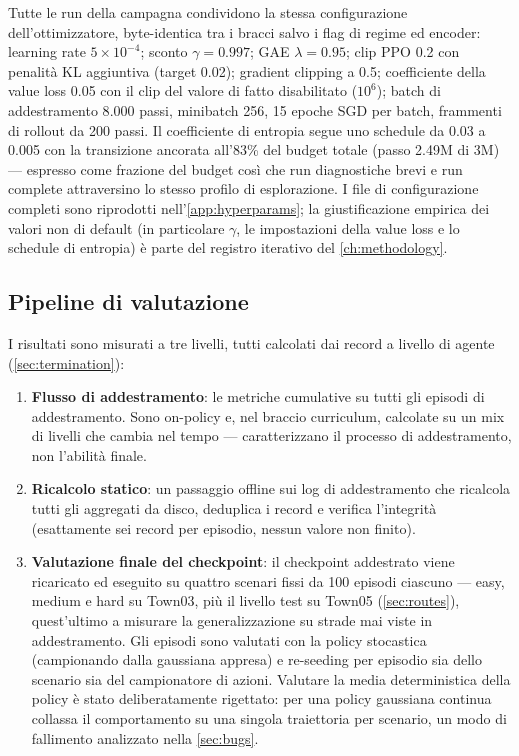 Tutte le run della campagna condividono la stessa configurazione
dell'ottimizzatore, byte-identica tra i bracci salvo i flag di regime ed
encoder: learning rate $5\times10^{-4}$; sconto $\gamma = 0.997$; GAE
$\lambda = 0.95$; clip PPO 0.2 con penalità KL aggiuntiva (target 0.02);
gradient clipping a 0.5; coefficiente della value loss 0.05 con il clip
del valore di fatto disabilitato ($10^6$); batch di addestramento
8{.}000 passi, minibatch 256, 15 epoche SGD per batch, frammenti di
rollout da 200 passi. Il coefficiente di entropia segue uno schedule da
0.03 a 0.005 con la transizione ancorata all'83\% del budget totale
(passo 2.49M di 3M) --- espresso come frazione del budget così che run
diagnostiche brevi e run complete attraversino lo stesso profilo di
esplorazione. I file di configurazione completi sono riprodotti
nell'\cref{app:hyperparams}; la giustificazione empirica dei valori non
di default (in particolare $\gamma$, le impostazioni della value loss e
lo schedule di entropia) è parte del registro iterativo del
\cref{ch:methodology}.

\subsection{Pipeline di valutazione}
\label{sec:eval-pipeline}

I risultati sono misurati a tre livelli, tutti calcolati dai record a
livello di agente (\cref{sec:termination}):

\begin{enumerate}
  \item \textbf{Flusso di addestramento}: le metriche cumulative su
        tutti gli episodi di addestramento. Sono on-policy e, nel
        braccio curriculum, calcolate su un mix di livelli che cambia
        nel tempo --- caratterizzano il processo di addestramento, non
        l'abilità finale.
  \item \textbf{Ricalcolo statico}: un passaggio offline sui log di
        addestramento che ricalcola tutti gli aggregati da disco,
        deduplica i record e verifica l'integrità (esattamente sei
        record per episodio, nessun valore non finito).
  \item \textbf{Valutazione finale del checkpoint}: il checkpoint
        addestrato viene ricaricato ed eseguito su quattro scenari
        fissi da 100 episodi ciascuno --- easy, medium e hard su
        Town03, più il livello test su Town05 (\cref{sec:routes}),
        quest'ultimo a misurare la generalizzazione su strade mai viste
        in addestramento. Gli episodi sono valutati con la policy
        stocastica (campionando dalla gaussiana appresa) e re-seeding
        per episodio sia dello scenario sia del campionatore di azioni.
        Valutare la media deterministica della policy è stato
        deliberatamente rigettato: per una policy gaussiana continua
        collassa il comportamento su una singola traiettoria per
        scenario, un modo di fallimento analizzato nella
        \cref{sec:bugs}.
\end{enumerate}
